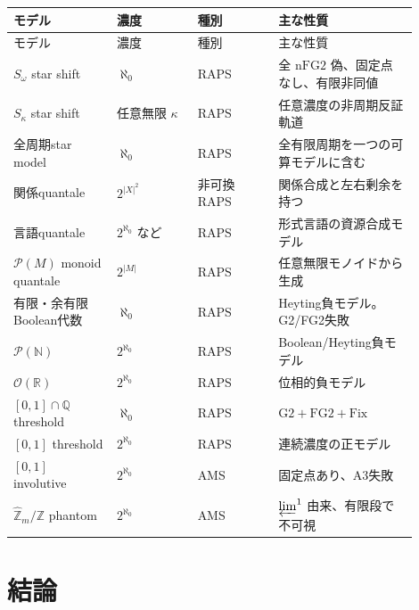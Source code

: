 \documentclass[uplatex,dvipdfmx,a4paper,10pt]{jsarticle}
\newcommand{\Gtwo}{\mathrm{G2}}
\newcommand{\FGtwo}{\mathrm{FG2}}
\newcommand{\nFGtwo}{\mathrm{nFG2}}
\newcommand{\Fix}{\mathrm{Fix}}
\newcommand{\Pow}{\mathcal P}
\begin{document}
\begin{longtable}{>{\raggedright\arraybackslash}p{0.23\linewidth}
                  >{\raggedright\arraybackslash}p{0.18\linewidth}
                  >{\raggedright\arraybackslash}p{0.18\linewidth}
                  >{\raggedright\arraybackslash}p{0.31\linewidth}}
\toprule
モデル & 濃度 & 種別 & 主な性質 \\
\midrule
\endfirsthead
\toprule
モデル & 濃度 & 種別 & 主な性質 \\
\midrule
\endhead
\(S_\omega\) star shift & \(\aleph_0\) & RAPS & 全 \(\nFGtwo\) 偽、固定点なし、有限非同値 \\
\midrule
\(S_\kappa\) star shift & 任意無限 \(\kappa\) & RAPS & 任意濃度の非周期反証軌道 \\
\midrule
全周期star model & \(\aleph_0\) & RAPS & 全有限周期を一つの可算モデルに含む \\
\midrule
関係quantale & \(2^{|X|^2}\) & 非可換RAPS & 関係合成と左右剰余を持つ \\
\midrule
言語quantale & \(2^{\aleph_0}\) など & RAPS & 形式言語の資源合成モデル \\
\midrule
\(\Pow(M)\) monoid quantale & \(2^{|M|}\) & RAPS & 任意無限モノイドから生成 \\
\midrule
有限・余有限Boolean代数 & \(\aleph_0\) & RAPS & Heyting負モデル。G2/FG2失敗 \\
\midrule
\(\Pow(\mathbb N)\) & \(2^{\aleph_0}\) & RAPS & Boolean/Heyting負モデル \\
\midrule
\(\mathcal O(\mathbb R)\) & \(2^{\aleph_0}\) & RAPS & 位相的負モデル \\
\midrule
\([0,1]\cap\mathbb Q\) threshold & \(\aleph_0\) & RAPS & \(\Gtwo+\FGtwo+\Fix\) \\
\midrule
\([0,1]\) threshold & \(2^{\aleph_0}\) & RAPS & 連続濃度の正モデル \\
\midrule
\([0,1]\) involutive & \(2^{\aleph_0}\) & AMS & 固定点あり、A3失敗 \\
\midrule
\(\widehat{\mathbb Z}_m/\mathbb Z\) phantom & \(2^{\aleph_0}\) & AMS & \(\varprojlim^1\) 由来、有限段で不可視 \\
\bottomrule
\end{longtable}

\section{結論}
\end{document}
